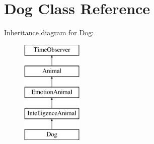 \hypertarget{class_dog}{}\section{Dog Class Reference}
\label{class_dog}
Inheritance diagram for Dog\+:\begin{figure}[H]
\begin{center}
\leavevmode
\includegraphics[height=5.000000cm]{class_dog}
\end{center}
\end{figure}
